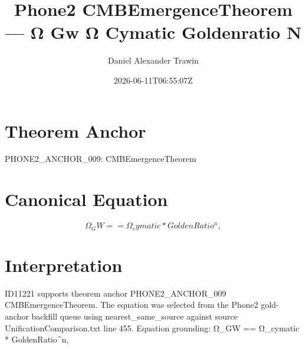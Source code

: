 \documentclass[11pt]{article}
\title{Phone2 CMBEmergenceTheorem — Ω Gw Ω Cymatic Goldenratio N}
\author{Daniel Alexander Trawin}
\date{2026-06-11T06:55:07Z}
\begin{document}
\maketitle
\section*{Theorem Anchor}
PHONE2_ANCHOR_009: CMBEmergenceTheorem
\section*{Canonical Equation}
\[
Ω_GW == Ω_cymatic * GoldenRatio^n,
\]
\section*{Interpretation}
ID11221 supports theorem anchor PHONE2_ANCHOR_009 CMBEmergenceTheorem. The equation was selected from the Phone2 gold-anchor backfill queue using nearest_same_source against source UnificationComparison.txt line 455. Equation grounding: Ω_GW == Ω_cymatic * GoldenRatio^n,
\end{document}
